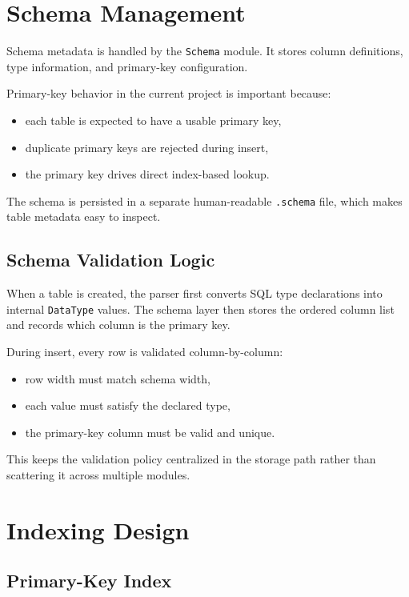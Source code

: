 \documentclass[12pt,a4paper]{article}
\begin{document}
\section{Schema Management}

Schema metadata is handled by the \texttt{Schema} module. It stores column
definitions, type information, and primary-key configuration.

Primary-key behavior in the current project is important because:

\begin{itemize}[leftmargin=1.8em]
  \item each table is expected to have a usable primary key,
  \item duplicate primary keys are rejected during insert,
  \item the primary key drives direct index-based lookup.
\end{itemize}

The schema is persisted in a separate human-readable \texttt{.schema} file,
which makes table metadata easy to inspect.

\subsection{Schema Validation Logic}

When a table is created, the parser first converts SQL type declarations into
internal \texttt{DataType} values. The schema layer then stores the ordered
column list and records which column is the primary key.

During insert, every row is validated column-by-column:

\begin{itemize}[leftmargin=1.8em]
  \item row width must match schema width,
  \item each value must satisfy the declared type,
  \item the primary-key column must be valid and unique.
\end{itemize}

This keeps the validation policy centralized in the storage path rather than
scattering it across multiple modules.

\section{Indexing Design}

\subsection{Primary-Key Index}
\end{document}
